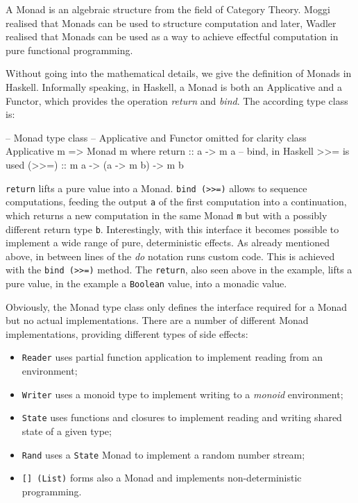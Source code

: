 A Monad is an algebraic structure from the field of Category Theory. Moggi \cite{moggi_computational_1989} realised that Monads can be used to structure computation and later, Wadler \cite{wadler_monads_1995,wadler_how_1997} realised that Monads can be used as a way to achieve effectful computation in pure functional programming. 

Without going into the mathematical details, we give the definition of Monads in Haskell. Informally speaking, in Haskell, a Monad is both an Applicative and a Functor, which provides the operation \textit{return} and \textit{bind}. The according type class is:

\begin{HaskellCode}
-- Monad type class
-- Applicative and Functor omitted for clarity
class Applicative m => Monad m where
  return :: a -> m a
  -- bind, in Haskell >>= is used
  (>>=) :: m a -> (a -> m b) -> m b
\end{HaskellCode}

%

\texttt{return} lifts a pure value into a Monad. \texttt{bind (>>=)} allows to sequence computations, feeding the output \texttt{a} of the first computation into a continuation, which returns a new computation in the same Monad \texttt{m} but with a possibly different return type \texttt{b}. Interestingly, with this interface it becomes possible to implement a wide range of pure, deterministic effects. As already mentioned above, in between lines of the \textit{do} notation runs custom code. This is achieved with the \texttt{bind (>>=)} method. The \texttt{return}, also seen above in the example, lifts a pure value, in the example a \texttt{Boolean} value, into a monadic value.

Obviously, the Monad type class only defines the interface required for a Monad but no actual implementations. There are a number of different Monad implementations, providing different types of side effects:

\begin{itemize}
	\item \texttt{Reader} uses partial function application to implement reading from an environment;
	\item \texttt{Writer} uses a monoid type to implement writing to a \textit{monoid} environment;
	\item \texttt{State} uses functions and closures to implement reading and writing shared state of a given type;
	\item \texttt{Rand} uses a \texttt{State} Monad to implement a random number stream;
	\item \texttt{[] (List)} forms also a Monad and implements non-deterministic programming.
\end{itemize}

